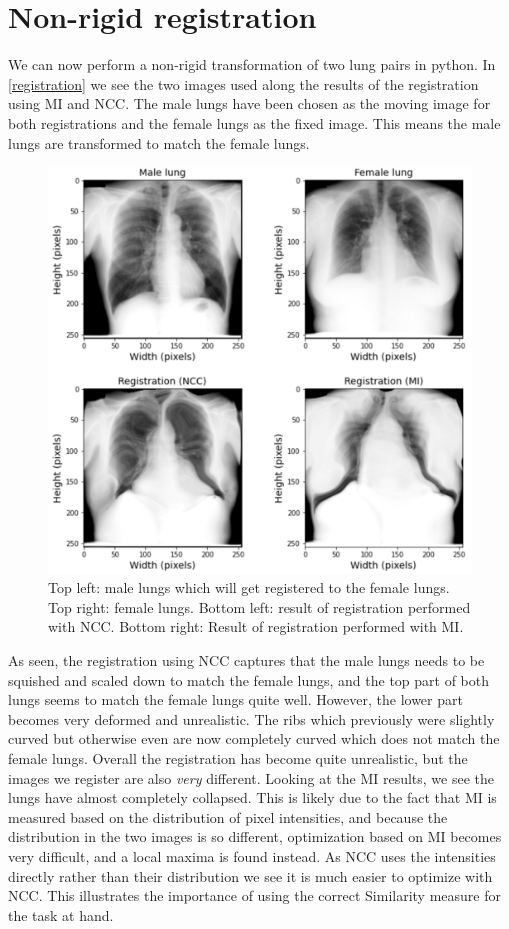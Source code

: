 \section{Non-rigid registration}
We can now perform a non-rigid transformation of two lung pairs in python. In \autoref{registration} we see the two images used along the results of the registration using MI and NCC. The male lungs have been chosen as the moving image for both registrations and the female lungs as the fixed image. This means the male lungs are transformed to match the female lungs. 

\begin{figure}[h]
	\centering
	\includegraphics[width=0.8\linewidth]{Materials/registration}
	\caption{Top left: male lungs which will get registered to the female lungs. Top right: female lungs. Bottom left: result of registration performed with NCC. Bottom right: Result of registration performed with MI.}
	\label{registration}
\end{figure}
As seen, the registration using NCC captures that the male lungs needs to be squished and scaled down to match the female lungs, and the top part of both lungs seems to match the female lungs quite well. However, the lower part becomes very deformed and unrealistic. The ribs which previously were slightly curved but otherwise even are now completely curved which does not match the female lungs. Overall the registration has become quite unrealistic, but the images we register are also \textit{very} different. Looking at the MI results, we see the lungs have almost completely collapsed. This is likely due to the fact that MI is measured based on the distribution of pixel intensities, and because the distribution in the two images is so different, optimization based on MI becomes very difficult, and a local maxima is found instead. As NCC uses the intensities directly rather than their distribution we see it is much easier to optimize with NCC. This illustrates the importance of using the correct Similarity measure for the task at hand.